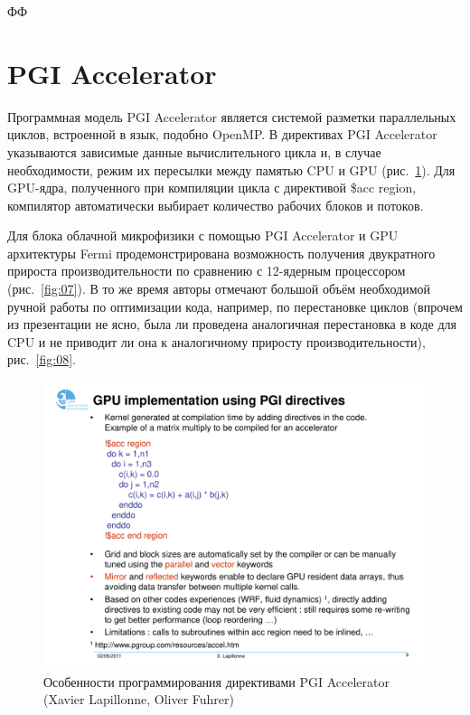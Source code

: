 \documentclass[a4,12pt]{report}
\begin{document}
ФФ

\section{PGI Accelerator}

Программная модель PGI Accelerator является системой разметки параллельных циклов, встроенной в язык, подобно OpenMP. В директивах PGI Accelerator указываются зависимые данные вычислительного цикла и, в случае необходимости, режим их пересылки между памятью CPU и GPU (рис.~\ref{fig:06}). Для GPU-ядра, полученного при компиляции цикла с директивой \$acc region, компилятор автоматически выбирает количество рабочих блоков и потоков.


Для блока облачной микрофизики с помощью PGI Accelerator и GPU архитектуры Fermi продемонстрирована возможность получения двукратного прироста производительности по сравнению с 12-ядерным процессором (рис.~\ref{fig:07}). В то же время авторы отмечают большой объём необходимой ручной работы по оптимизации кода, например, по перестановке циклов (впрочем из презентации не ясно, была ли проведена аналогичная перестановка в коде для CPU и не приводит ли она к аналогичному приросту производительности), рис.~\ref{fig:08}.

\begin{figure}
\centering
\includegraphics[scale=0.4]{slides/06.pdf}
\caption{Особенности программирования директивами PGI Accelerator (Xavier Lapillonne, Oliver Fuhrer)}
\label{fig:06}
\end{figure}
\end{document}
